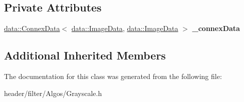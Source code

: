 \subsection*{Private Attributes}
\begin{DoxyCompactItemize}
\item 
\mbox{\label{classfilter_1_1algos_1_1_grayscale_a608895d90327d9fceb9164f8ac480ea2}} 
\hyperlink{classfilter_1_1data_1_1_connex_data}{data\+::\+Connex\+Data}$<$ \hyperlink{classfilter_1_1data_1_1_image_data}{data\+::\+Image\+Data}, \hyperlink{classfilter_1_1data_1_1_image_data}{data\+::\+Image\+Data} $>$ {\bfseries \+\_\+connex\+Data}
\end{DoxyCompactItemize}
\subsection*{Additional Inherited Members}


The documentation for this class was generated from the following file\+:\begin{DoxyCompactItemize}
\item 
header/filter/\+Algos/Grayscale.\+h\end{DoxyCompactItemize}

